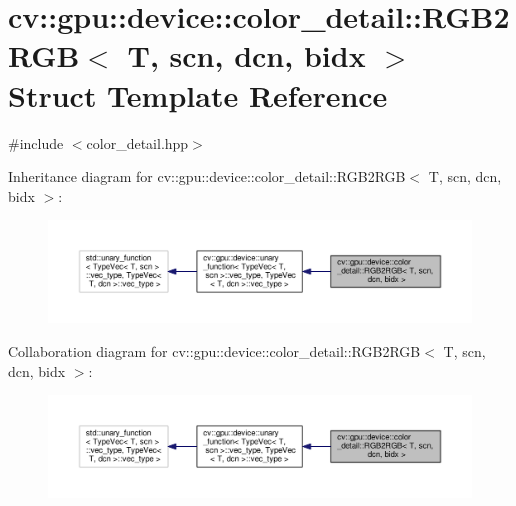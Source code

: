 \hypertarget{structcv_1_1gpu_1_1device_1_1color__detail_1_1RGB2RGB}{\section{cv\-:\-:gpu\-:\-:device\-:\-:color\-\_\-detail\-:\-:R\-G\-B2\-R\-G\-B$<$ T, scn, dcn, bidx $>$ Struct Template Reference}
\label{structcv_1_1gpu_1_1device_1_1color__detail_1_1RGB2RGB}
}


{\ttfamily \#include $<$color\-\_\-detail.\-hpp$>$}



Inheritance diagram for cv\-:\-:gpu\-:\-:device\-:\-:color\-\_\-detail\-:\-:R\-G\-B2\-R\-G\-B$<$ T, scn, dcn, bidx $>$\-:\nopagebreak
\begin{figure}[H]
\begin{center}
\leavevmode
\includegraphics[width=350pt]{structcv_1_1gpu_1_1device_1_1color__detail_1_1RGB2RGB__inherit__graph}
\end{center}
\end{figure}


Collaboration diagram for cv\-:\-:gpu\-:\-:device\-:\-:color\-\_\-detail\-:\-:R\-G\-B2\-R\-G\-B$<$ T, scn, dcn, bidx $>$\-:\nopagebreak
\begin{figure}[H]
\begin{center}
\leavevmode
\includegraphics[width=350pt]{structcv_1_1gpu_1_1device_1_1color__detail_1_1RGB2RGB__coll__graph}
\end{center}
\end{figure}

